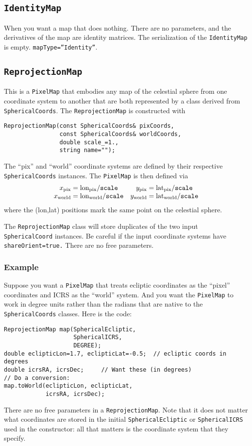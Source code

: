 \documentclass[11pt,preprint,flushrt]{aastex}
\begin{document}
\subsection{{\tt IdentityMap}}
When you want a map that does nothing.  There are no parameters, and the derivatives of the map are identity matrices.  The serialization of the {\tt IdentityMap} is empty.  {\tt mapType=''Identity''}.

\subsection{{\tt ReprojectionMap}}
This is a {\tt PixelMap} that embodies any map of the celestial sphere from one coordinate system to another that are both represented by a class derived from {\tt SphericalCoords}.  The {\tt ReprojectionMap} is constructed with
\begin{verbatim}
ReprojectionMap(const SphericalCoords& pixCoords,
                const SphericalCoords& worldCoords,
                double scale_=1.,
                string name="");
\end{verbatim}
The ``pix'' and ``world'' coordinate systems are defined by their respective {\tt SphericalCoords} instances.  The {\tt PixelMap} is then defined via
\begin{equation}
\begin{array}{cc}
x_{\rm pix} = {\rm lon}_{\rm pix}/{\tt scale} & y_{\rm pix} = {\rm lat}_{\rm pix}/{\tt scale}  \\
x_{\rm world} = {\rm lon}_{\rm world}/{\tt scale} & y_{\rm world} = {\rm lat}_{\rm world}/{\tt scale} 
\end{array}
\end{equation}
where the (lon,lat) positions mark the same point on the celestial sphere.  

The {\tt ReprojectionMap} class will store duplicates of the two input {\tt SphericalCoord} instances.  Be careful if the input coordinate systems have {\tt shareOrient=true.}  There are no free parameters.

\subsubsection{Example}
Suppose you want a {\tt PixelMap} that treats ecliptic coordinates as the ``pixel'' coordinates and ICRS as the ``world'' system.  And you want the {\tt PixelMap} to work in degree units rather than the radians that are native to the {\tt SphericalCoords} classes.  Here is the code:
\begin{verbatim}
ReprojectionMap map(SphericalEcliptic,
                    SphericalICRS,
                    DEGREE);
double eclipticLon=1.7, eclipticLat=-0.5;  // ecliptic coords in degrees
double icrsRA, icrsDec;     // Want these (in degrees)
// Do a conversion:
map.toWorld(eclipticLon, eclipticLat,
            icrsRA, icrsDec);
\end{verbatim}
There are no free parameters in a {\tt ReprojectionMap}.  Note that it does not matter what coordinates are stored in the initial {\tt SphericalEcliptic} or {\tt SphericalICRS} used in the constructor: all that matters is the coordinate system that they specify.
\end{document}
